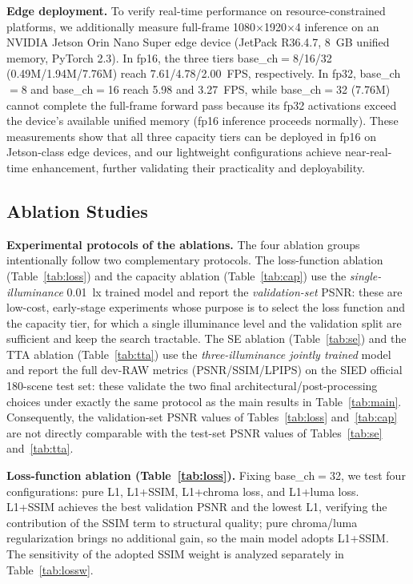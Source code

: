 \documentclass[remotesensing,article,accept,moreauthors]{Definitions/mdpi}
\begin{document}
\textbf{Edge deployment.} To verify real-time performance on resource-constrained platforms, we additionally measure full-frame 1080$\times$1920$\times$4 inference on an NVIDIA Jetson Orin Nano Super edge device (JetPack R36.4.7, 8~GB unified memory, PyTorch 2.3). In fp16, the three tiers base\_ch$=$8/16/32 (0.49M/1.94M/7.76M) reach 7.61/4.78/2.00~FPS, respectively. In fp32, base\_ch$=$8 and base\_ch$=$16 reach 5.98 and 3.27~FPS, while base\_ch$=$32 (7.76M) cannot complete the full-frame forward pass because its fp32 activations exceed the device's available unified memory (fp16 inference proceeds normally). These measurements show that all three capacity tiers can be deployed in fp16 on Jetson-class edge devices, and our lightweight configurations achieve near-real-time enhancement, further validating their practicality and deployability.

\subsection{Ablation Studies}
\label{sec:ablation}

\textbf{Experimental protocols of the ablations.} The four ablation groups intentionally follow two complementary protocols. The loss-function ablation (Table~\ref{tab:loss}) and the capacity ablation (Table~\ref{tab:cap}) use the \emph{single-illuminance} 0.01~lx trained model and report the \emph{validation-set} PSNR: these are low-cost, early-stage experiments whose purpose is to select the loss function and the capacity tier, for which a single illuminance level and the validation split are sufficient and keep the search tractable. The SE ablation (Table~\ref{tab:se}) and the TTA ablation (Table~\ref{tab:tta}) use the \emph{three-illuminance jointly trained} model and report the full dev-RAW metrics (PSNR/SSIM/LPIPS) on the SIED official 180-scene test set: these validate the two final architectural/post-processing choices under exactly the same protocol as the main results in Table~\ref{tab:main}. Consequently, the validation-set PSNR values of Tables~\ref{tab:loss} and~\ref{tab:cap} are not directly comparable with the test-set PSNR values of Tables~\ref{tab:se} and~\ref{tab:tta}.

\textbf{Loss-function ablation (Table~\ref{tab:loss}).} Fixing base\_ch$=$32, we test four configurations: pure L1, L1+SSIM, L1+chroma loss, and L1+luma loss. L1+SSIM achieves the best validation PSNR and the lowest L1, verifying the contribution of the SSIM term to structural quality; pure chroma/luma regularization brings no additional gain, so the main model adopts L1+SSIM. The sensitivity of the adopted SSIM weight is analyzed separately in Table~\ref{tab:lossw}.
\end{document}
